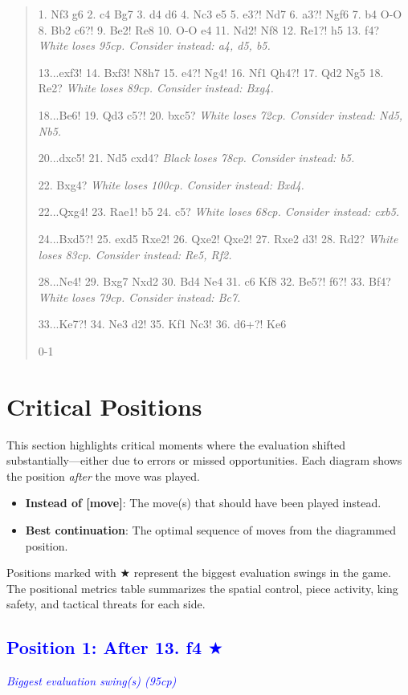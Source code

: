 \documentclass[11pt]{book}
\begin{document}
\begin{quote}
1. Nf3 g6
2. c4 Bg7
3. d4 d6
4. Nc3 e5
5. e3?! Nd7
6. a3?! Ngf6
7. b4 O-O
8. Bb2 c6?!
9. Be2! Re8
10. O-O e4
11. Nd2! Nf8
12. Re1?! h5
13. f4?
\textit{White loses 95cp. Consider instead: a4, d5, b5.}

13...exf3!
14. Bxf3! N8h7
15. e4?! Ng4!
16. Nf1 Qh4?!
17. Qd2 Ng5
18. Re2?
\textit{White loses 89cp. Consider instead: Bxg4.}

18...Be6!
19. Qd3 c5?!
20. bxc5?
\textit{White loses 72cp. Consider instead: Nd5, Nb5.}

20...dxc5!
21. Nd5 cxd4?
\textit{Black loses 78cp. Consider instead: b5.}

22. Bxg4?
\textit{White loses 100cp. Consider instead: Bxd4.}

22...Qxg4!
23. Rae1! b5
24. c5?
\textit{White loses 68cp. Consider instead: cxb5.}

24...Bxd5?!
25. exd5 Rxe2!
26. Qxe2! Qxe2!
27. Rxe2 d3!
28. Rd2?
\textit{White loses 83cp. Consider instead: Re5, Rf2.}

28...Ne4!
29. Bxg7 Nxd2
30. Bd4 Ne4
31. c6 Kf8
32. Be5?! f6?!
33. Bf4?
\textit{White loses 79cp. Consider instead: Bc7.}

33...Ke7?!
34. Ne3 d2!
35. Kf1 Nc3!
36. d6+?! Ke6

0-1
\end{quote}

\section{Critical Positions}

This section highlights critical moments where the evaluation shifted substantially---either due to errors or missed opportunities. Each diagram shows the position \emph{after} the move was played.

\begin{itemize}
\item \textbf{Instead of [move]}: The move(s) that should have been played instead.
\item \textbf{Best continuation}: The optimal sequence of moves from the diagrammed position.
\end{itemize}

Positions marked with {\color{blue}$\bigstar$} represent the biggest evaluation swings in the game. The positional metrics table summarizes the spatial control, piece activity, king safety, and tactical threats for each side.

\subsection*{\textcolor{blue}{Position 1: After 13. f4 $\bigstar$}}
\textit{\textcolor{blue}{Biggest evaluation swing(s) (95cp)}}
\end{document}
